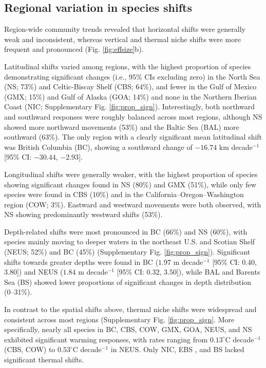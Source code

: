 \documentclass[11pt]{article}
\begin{document}
\begin{spacing}{1.5}
\subsection{Regional variation in species shifts}

Region-wide community trends revealed that horizontal shifts were generally weak and inconsistent, whereas vertical and thermal niche shifts were more frequent and pronounced (Fig. \ref{fig:effsize}b). 

Latitudinal shifts varied among regions, with the highest proportion of species demonstrating significant changes (i.e., 95\% CIs excluding zero) in the North Sea (NS; 73\%) and Celtic-Biscay Shelf (CBS; 64\%), and fewer in the Gulf of Mexico (GMX; 15\%) and Gulf of Alaska (GOA; 14\%) and none in the Northern Iberian Coast (NIC; Supplementary Fig. \ref{fig:prop_sign}). Interestingly, both northward and southward responses were roughly balanced across most regions, although NS showed more northward movements (53\%) and the Baltic Sea (BAL) more southward (63\%). The only region with a clearly significant mean latitudinal shift was British Columbia (BC), showing a southward change of $-16.74$ km decade$^{-1}$ [95\% CI: $-30.44$, $-2.93$].

Longitudinal shifts  were generally weaker, with the highest proportion of species showing significant changes found in NS (80\%) and GMX (51\%), while only few species were found in CBS (10\%) and in the California–Oregon–Washington region (COW; 3\%). Eastward and westward movements were both observed, with NS showing predominantly westward shifts (53\%).

Depth-related shifts were most pronounced in BC (66\%) and NS (60\%), with species mainly moving to deeper waters in the northeast U.S. and Scotian Shelf (NEUS; 52\%) and BC (45\%) (Supplementary Fig. \ref{fig:prop_sign}). Significant shifts towards greater depths were found in BC ($1.97$ m decade$^{-1}$ [95\% CI: $0.40$, $3.80$]) and NEUS ($1.84$ m decade$^{-1}$ [95\% CI: $0.32$, $3.50$]), while BAL and Barents Sea (BS) showed lower proportions of significant changes in depth distribution (0–31\%).

In contrast to the spatial shifts above, thermal niche shifts were widespread and consistent across most regions (Supplementary Fig. \ref{fig:prop_sign}. More specifically, nearly all species in BC, CBS, COW, GMX, GOA, NEUS, and NS exhibited significant warming responses, with rates ranging from $0.13^{\circ}$C decade$^{-1}$ (CBS, COW) to $0.53^{\circ}$C decade$^{-1}$ in NEUS. Only NIC, EBS , and BS lacked significant thermal shifts.



\end{spacing}
\end{document}
